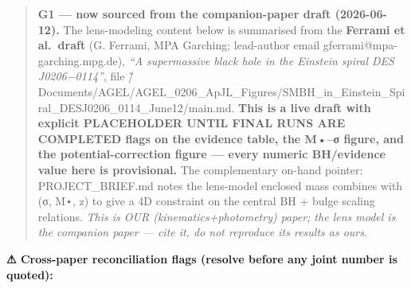 \documentclass[
]{article}
\newcommand{\BreakablePath}[1]{{\ttfamily\sloppy #1}}
\begin{document}
\begin{quote}
\textbf{G1 --- now sourced from the companion-paper draft (2026-06-12).}
The lens-modeling content below is summarised from the \textbf{Ferrami
et al.~draft} (G. Ferrami, MPA Garching; lead-author email
gferrami@mpa-garching.mpg.de), \emph{``A supermassive black hole in the
Einstein spiral DES J0206−0114''}, file
\BreakablePath{\~/\discretionary{}{}{}Documents/\discretionary{}{}{}AGEL/\discretionary{}{}{}AGEL\_\discretionary{}{}{}0206\_\discretionary{}{}{}ApJL\_\discretionary{}{}{}Figures/\discretionary{}{}{}SMBH\_\discretionary{}{}{}in\_\discretionary{}{}{}Einstein\_\discretionary{}{}{}Spiral\_\discretionary{}{}{}DESJ0206\_\discretionary{}{}{}0114\_\discretionary{}{}{}June12/\discretionary{}{}{}main.\discretionary{}{}{}md}.
\textbf{This is a live draft with explicit
\BreakablePath{PLACEHOLDER UNTIL FINAL RUNS ARE COMPLETED} flags on the
evidence table, the M•--σ figure, and the potential-correction figure
--- every numeric BH/evidence value here is provisional.} The
complementary on-hand pointer: PROJECT\_BRIEF.md notes the lens-model
enclosed mass combines with (σ, M⋆, z) to give a 4D constraint on the
central BH + bulge scaling relations. \emph{This is OUR
(kinematics+photometry) paper; the lens model is the companion paper ---
cite it, do not reproduce its results as ours.}
\end{quote}

\textbf{⚠ Cross-paper reconciliation flags (resolve before any joint
number is quoted):}
\end{document}
